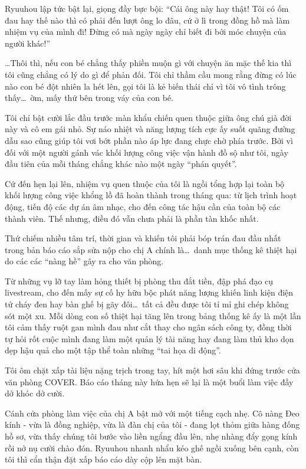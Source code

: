 \documentclass[../main.tex]{subfiles}
\begin{document}
Ryuuhou lập tức bật lại, giọng đầy bực bội: ``Cái ông này hay thật! Tôi có ốm đau hay thế nào thì có phải đến lượt ông lo đâu, cứ ở lì trong đồng hồ mà làm nhiệm vụ của mình đi! Đừng có mà ngày ngày chỉ biết đi bới móc chuyện của người khác!''

\dots Thôi thì, nếu con bé chẳng thấy phiền muộn gì với chuyện ăn mặc thế kia thì tôi cũng chẳng có lý do gì để phản đối. Tôi chỉ thầm cầu mong rằng đừng có lúc nào con bé đột nhiên la hét lên, gọi tôi là kẻ biến thái chỉ vì tôi vô tình trông thấy\dots\ ờm, mấy thứ bên trong váy của con bé.

Tôi chỉ bật cười lắc đầu trước màn khẩu chiến quen thuộc giữa ông chú già đời này và cô em gái nhỏ. Sự náo nhiệt và năng lượng tích cực ấy suốt quãng đường dẫu sao cũng giúp tôi vơi bớt phần nào áp lực đang chực chờ phía trước. Bởi vì đối với một người gánh vác khối lượng công việc vận hành đồ sộ như tôi, ngày đầu tiên của mỗi tháng chẳng khác nào một ngày ``phán quyết''.

Cứ đến hẹn lại lên, nhiệm vụ quen thuộc của tôi là ngồi tổng hợp lại toàn bộ khối lượng công việc khổng lồ đã hoàn thành trong tháng qua: từ lịch trình hoạt động, tiến độ các dự án âm nhạc, cho đến công tác hậu cần của toàn bộ các thành viên. Thế nhưng, điều đó vẫn chưa phải là phần tàn khốc nhất.

Thứ chiếm nhiều tâm trí, thời gian và khiến tôi phải bóp trán đau đầu nhất trong bản báo cáo sắp sửa nộp cho chị A chính là\dots\ danh mục thống kê thiệt hại do các các ``nàng hề'' gây ra cho văn phòng.

Từ những vụ lỡ tay làm hỏng thiết bị phòng thu đắt tiền, đập phá đạo cụ livestream, cho đến mấy sự cố hy hữu bộc phát năng lượng khiến linh kiện điện tử cháy đen hay bàn ghế bị gãy đôi\dots\ tất cả đều được tôi tỉ mỉ ghi chép không sót một xu. Mỗi dòng con số thiệt hại tăng lên trong bảng thống kê ấy là một lần tôi cảm thấy ruột gan mình đau như cắt thay cho ngân sách công ty, đồng thời tự hỏi rốt cuộc mình đang làm một quản lý tài năng hay đang làm thủ kho dọn dẹp hậu quả cho một tập thể toàn những ``tai họa di động''.

Tôi ôm chặt xấp tài liệu nặng trịch trong tay, hít một hơi sâu khi đứng trước cửa văn phòng COVER. Báo cáo tháng này hứa hẹn sẽ lại là một buổi làm việc đầy dở khóc dở cười.

\ct

Cánh cửa phòng làm việc của chị A bật mở với một tiếng cạch nhẹ. Cô nàng Đeo kính - vừa là đồng nghiệp, vừa là đàn chị của tôi - đang lọt thỏm giữa hàng đống hồ sơ, vừa thấy chúng tôi bước vào liền ngẩng đầu lên, nhẹ nhàng đẩy gọng kính rồi nở nụ cười chào đón. Ryuuhou nhanh nhẩu kéo ghế ngồi xuống bên cạnh, còn tôi thì cẩn thận đặt xấp báo cáo dày cộp lên mặt bàn.
\end{document}
